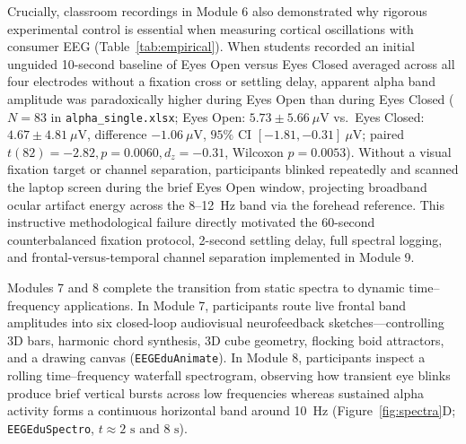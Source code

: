 \documentclass[11pt,letterpaper]{article}
\providecommand{\ModSixClassN}{83}
\providecommand{\ModSixClassDF}{82}
\providecommand{\ModSixClassOpenMean}{5.73}
\providecommand{\ModSixClassOpenSD}{5.66}
\providecommand{\ModSixClassClosedMean}{4.67}
\providecommand{\ModSixClassClosedSD}{4.81}
\providecommand{\ModSixClassT}{-2.82}
\providecommand{\ModSixClassP}{0.0060}
\providecommand{\ModSixClassWilcoxP}{0.0053}
\providecommand{\ModSixClassDz}{-0.31}
\providecommand{\ModSixClassDiffMean}{-1.06}
\providecommand{\ModSixClassCILow}{-1.81}
\providecommand{\ModSixClassCIHigh}{-0.31}
\begin{document}
Crucially, classroom recordings in Module 6 also demonstrated why rigorous experimental control is essential when measuring cortical oscillations with consumer EEG (Table~\ref{tab:empirical}). When students recorded an initial unguided 10-second baseline of Eyes Open versus Eyes Closed averaged across all four electrodes without a fixation cross or settling delay, apparent alpha band amplitude was paradoxically higher during Eyes Open than during Eyes Closed ($N = \ModSixClassN$ in \texttt{alpha\_single.xlsx}; Eyes Open: $\ModSixClassOpenMean \pm \ModSixClassOpenSD\ \mu\text{V}$ vs.\ Eyes Closed: $\ModSixClassClosedMean \pm \ModSixClassClosedSD\ \mu\text{V}$, difference $\ModSixClassDiffMean\ \mu\text{V}$, $95\%\text{ CI } [\ModSixClassCILow, \ModSixClassCIHigh]\ \mu\text{V}$; paired $t(\ModSixClassDF) = \ModSixClassT, p = \ModSixClassP, d_z = \ModSixClassDz$, Wilcoxon $p = \ModSixClassWilcoxP$). Without a visual fixation target or channel separation, participants blinked repeatedly and scanned the laptop screen during the brief Eyes Open window, projecting broadband ocular artifact energy across the 8--12~Hz band via the forehead reference. This instructive methodological failure directly motivated the 60-second counterbalanced fixation protocol, 2-second settling delay, full spectral logging, and frontal-versus-temporal channel separation implemented in Module 9.

Modules 7 and 8 complete the transition from static spectra to dynamic time--frequency applications. In Module 7, participants route live frontal band amplitudes into six closed-loop audiovisual neurofeedback sketches---controlling 3D bars, harmonic chord synthesis, 3D cube geometry, flocking boid attractors, and a drawing canvas (\texttt{EEGEduAnimate}). In Module 8, participants inspect a rolling time--frequency waterfall spectrogram, observing how transient eye blinks produce brief vertical bursts across low frequencies whereas sustained alpha activity forms a continuous horizontal band around 10~Hz (Figure~\ref{fig:spectra}D; \texttt{EEGEduSpectro}, $t \approx 2\text{ s}$ and $8\text{ s}$).
\end{document}

